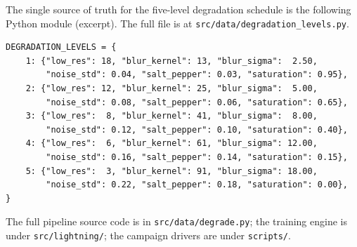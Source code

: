 The single source of truth for the five-level degradation schedule is the
following Python module (excerpt). The full file is at
\texttt{src/data/degradation\_levels.py}.

\begin{small}\begin{verbatim}
DEGRADATION_LEVELS = {
    1: {"low_res": 18, "blur_kernel": 13, "blur_sigma":  2.50,
        "noise_std": 0.04, "salt_pepper": 0.03, "saturation": 0.95},
    2: {"low_res": 12, "blur_kernel": 25, "blur_sigma":  5.00,
        "noise_std": 0.08, "salt_pepper": 0.06, "saturation": 0.65},
    3: {"low_res":  8, "blur_kernel": 41, "blur_sigma":  8.00,
        "noise_std": 0.12, "salt_pepper": 0.10, "saturation": 0.40},
    4: {"low_res":  6, "blur_kernel": 61, "blur_sigma": 12.00,
        "noise_std": 0.16, "salt_pepper": 0.14, "saturation": 0.15},
    5: {"low_res":  3, "blur_kernel": 91, "blur_sigma": 18.00,
        "noise_std": 0.22, "salt_pepper": 0.18, "saturation": 0.00},
}
\end{verbatim}\end{small}

The full pipeline source code is in \texttt{src/data/degrade.py}; the
training engine is under \texttt{src/lightning/}; the campaign drivers are
under \texttt{scripts/}.
